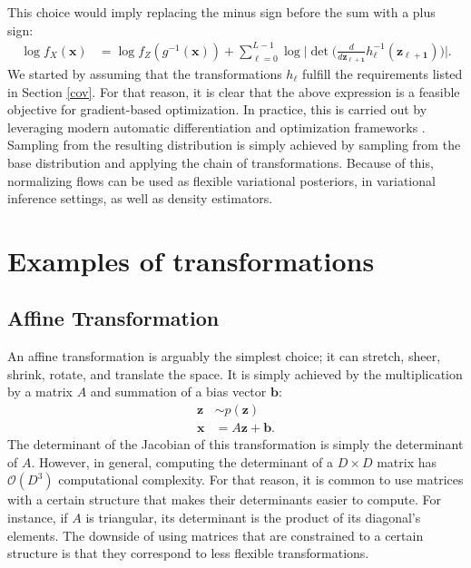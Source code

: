 This choice would imply replacing the minus sign before the sum with a plus sign:
\begin{align}
    \log f_X(\bm{x}) &= \log f_Z(g^{-1}(\bm{x})) + \sum_{\ell=0}^{L-1} \log \Big|\det\Big(\frac{d}{d\bm{z_{\ell+1}}}h_{\ell}^{-1}(\bm{z_{\ell+1}})\Big) \Big|.
\end{align}
We started by assuming that the transformations $h_\ell$ fulfill the requirements
listed in Section \ref{cov}. For that reason, it is clear that the above expression
is a feasible objective for gradient-based optimization. In practice, this is carried
out by leveraging modern automatic differentiation and optimization frameworks \autocites{flowpp, Glow, real-nvp}.
Sampling from the resulting distribution is simply achieved by sampling from the base
distribution and applying the chain of transformations. Because of this, normalizing
flows can be used as flexible variational posteriors, in variational
inference settings, as well as density estimators.

\section{Examples of transformations}
\subsection{Affine Transformation}
An affine transformation is arguably the simplest choice; it can
stretch, sheer, shrink, rotate, and translate the space. It is simply achieved
by the multiplication by a matrix $A$ and summation of a bias vector $\bm{b}$:
\begin{align}
    \bm{z} &\sim p(\bm{z}) \\
    \bm{x} &= A\bm{z} + \bm{b}.
\end{align}
The determinant of the Jacobian of this transformation is simply the determinant
of $A$. However, in general, computing the determinant of a $D \times D$
matrix has $\mathcal{O}(D^3)$ computational complexity. For that reason, it is
common to use matrices with a certain structure that makes their determinants
easier to compute. For instance, if $A$ is triangular, its determinant is
the product of its diagonal's elements. The downside of using matrices that are
constrained to a certain structure is that they correspond to less flexible transformations.

